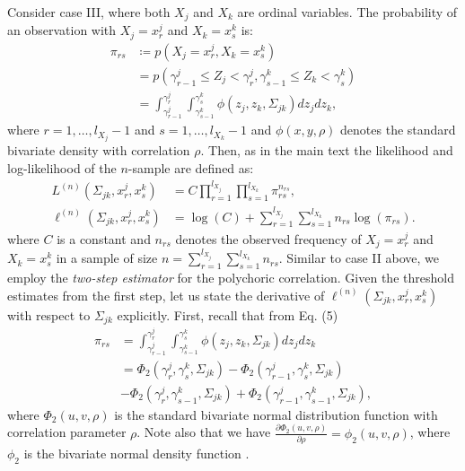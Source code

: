 Consider case III, where both $X_j$ and $X_k$ are ordinal variables. The probability of an observation with $X_j = x_r^j$ and $X_k = x_s^k$ is:
\begin{equation}\label{cell_probabilities_appendix}
    \begin{split}
        \pi_{rs} &\coloneqq p(X_j = x_r^j, X_k = x_s^k) \\
        &= p(\gamma^j_{r-1} \leq Z_j < \gamma^j_r, \gamma^k_{s-1} \leq Z_k < \gamma^k_s) \\
        &= \int_{\gamma^j_{r-1}}^{\gamma^j_{r}} \int_{\gamma^k_{s-1}}^{\gamma^k_{s}} \phi(z_j,z_k,\Sigma_{jk}) dz_j dz_k,
    \end{split}
\end{equation}
where $r = 1, \dots, l_{X_j}-1$ and $s = 1, \dots, l_{X_k}-1$ and $\phi(x,y,\rho)$ denotes the standard bivariate density with correlation $\rho$. Then, as in the main text the likelihood and log-likelihood of the $n$-sample are defined as:
\begin{equation}\label{polychoric_likelihood_appendix}
    \begin{split}
        L^{(n)}(\Sigma_{jk}, x^j_r,x^k_s) &= C \prod_{r=1}^{l_{X_{j}}} \prod_{s=1}^{l_{X_{k}}} \pi_{rs}^{n_{rs}}, \\
        \ell^{(n)}(\Sigma_{jk}, x^j_r,x^k_s) &= \log(C) + \sum_{r=1}^{l_{X_{j}}}\sum_{s=1}^{l_{X_{k}}} n_{rs} \log(\pi_{rs}).  
    \end{split}
\end{equation}
where $C$ is a constant and $n_{rs}$ denotes the observed frequency of $X_j = x_r^j$ and $X_k = x_s^k$ in a sample of size $n= \sum_{r=1}^{l_{X_{j}}}\sum_{s=1}^{l_{X_{k}}} n_{rs}$.
Similar to case II above, we employ the \textit{two-step estimator} for the polychoric correlation. Given the threshold estimates from the first step, let us state the derivative of $\ell^{(n)}(\Sigma_{jk}, x^j_r,x^k_s)$ with respect to $\Sigma_{jk}$ explicitly. First, recall that from Eq. (5) %
\begin{equation}
    \begin{split}
        \pi_{rs} &= \int_{{\gamma}^j_{r-1}}^{{\gamma}^j_{r}} \int_{{\gamma}^k_{s-1}}^{{\gamma}^k_{s}} \phi(z_j,z_k,\Sigma_{jk}) dz_j dz_k \\
        &= \Phi_2({\gamma}^j_r, {\gamma}^k_s, \Sigma_{jk}) - \Phi_2({\gamma}^j_{r-1}, {\gamma}^k_s, \Sigma_{jk}) \\ 
        &- \Phi_2({\gamma}^j_r, {\gamma}^k_{s-1}, \Sigma_{jk}) + \Phi_2({\gamma}^j_{r-1}, {\gamma}^k_{s-1}, \Sigma_{jk}),
    \end{split}
\end{equation}
where $\Phi_2(u,v,\rho)$ is the standard bivariate normal distribution function with correlation parameter $\rho$. Note also that we have $\frac{\partial \Phi_2(u,v, \rho)}{\partial \rho} = \phi_2(u,v, \rho)$, where $\phi_2$ is the bivariate normal density function \citep{Tallis62}.  

